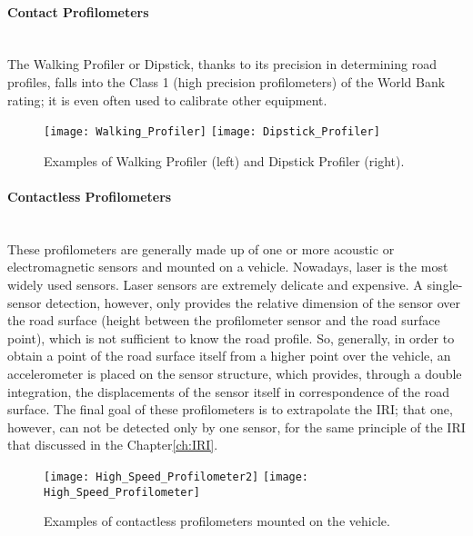 \documentclass[tesi]{subfiles}
\begin{document}
\begin{enumerate}
\paragraph{Contact Profilometers}\leavevmode\\
The Walking Profiler or Dipstick\cite{little_book}, thanks to its precision in determining road profiles, falls into the Class 1 (high precision profilometers) of the World Bank rating\cite{sayers1995calculation}; it is even often used to calibrate other equipment.


\begin{figure}[H]
\centering
\texttt{[image: Walking\_Profiler]}
\hspace{1.5cm}
\texttt{[image: Dipstick\_Profiler]}
\caption{Examples of Walking Profiler (left) and Dipstick Profiler (right).}
\label{fig:contact_profiler}
\end{figure}
\clearpage
\paragraph{Contactless Profilometers}\leavevmode\\  These profilometers are generally made up of one or more acoustic or electromagnetic sensors and mounted on a vehicle. Nowadays, laser is the most widely used sensors.
Laser sensors are extremely delicate and expensive. A single-sensor detection, however, only provides the relative dimension of the sensor over the road surface (height between the profilometer sensor and the road surface point), which is not sufficient to know the road profile. So, generally, in order to obtain a point of the road surface itself from a higher point over the vehicle, an accelerometer is placed on the sensor structure, which provides, through a double integration, the displacements of the sensor itself in correspondence of the road surface. The final goal of these profilometers is to extrapolate the IRI; that one, however, can not be detected only by one sensor, for the same principle of the IRI that discussed in the Chapter\ref{ch:IRI}.

\vspace{0.35cm}
\begin{figure}[H]
\centering
\texttt{[image: High\_Speed\_Profilometer2]}
\hspace{1cm}
\texttt{[image: High\_Speed\_Profilometer]}
\caption{Examples of contactless profilometers mounted on the vehicle.}
\label{fig:contact_less_profiler}
\end{figure}


\end{enumerate}
\end{document}
